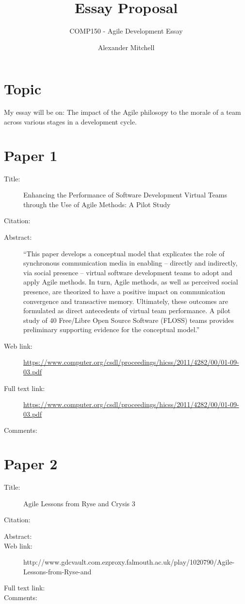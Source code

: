 \documentclass{scrartcl}
\title{Essay Proposal}
\subtitle{COMP150 - Agile Development Essay}
\author{Alexander Mitchell}
\begin{document}
\maketitle

\section*{Topic}

My essay will be on: The impact of the Agile philosopy to the morale of a team across various stages in a development cycle.


\section*{Paper 1}
\begin{description}
\item[Title:] Enhancing the Performance of Software Development Virtual Teams through the Use of Agile Methods: A Pilot Study
\item[Citation:] \cite{bibtex_key}
\item[Abstract:] ``This paper develops a conceptual model that
explicates the role of synchronous communication
media in enabling – directly and indirectly, via social
presence – virtual software development teams to
adopt and apply Agile methods. In turn, Agile
methods, as well as perceived social presence, are
theorized to have a positive impact on
communication convergence and transactive
memory. Ultimately, these outcomes are formulated
as direct antecedents of virtual team performance. A
pilot study of 40 Free/Libre Open Source Software
(FLOSS) teams provides preliminary supporting
evidence for the conceptual model.''
\item[Web link:] \url{https://www.computer.org/csdl/proceedings/hicss/2011/4282/00/01-09-03.pdf}
\item[Full text link:] \url{https://www.computer.org/csdl/proceedings/hicss/2011/4282/00/01-09-03.pdf}
\item[Comments:]
\end{description}

\section*{Paper 2}
\begin{description}
\item[Title:] Agile Lessons from Ryse and Crysis 3
\item[Citation:] \cite{bibtex_key}
\item[Abstract:] 
\item[Web link:] http://www.gdcvault.com.ezproxy.falmouth.ac.uk/play/1020790/Agile-Lessons-from-Ryse-and
\item[Full text link:] 
\item[Comments:] 
\end{description}
\end{document}
